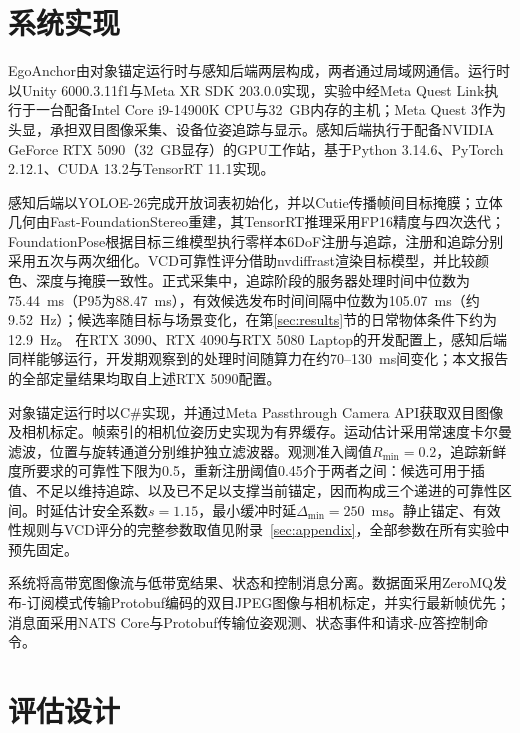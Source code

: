 \documentclass[review]{vgtc}
\begin{document}
\section{系统实现}\label{sec:implementation}

EgoAnchor由对象锚定运行时与感知后端两层构成，两者通过局域网通信。运行时以Unity 6000.3.11f1与Meta XR SDK 203.0.0实现，实验中经Meta Quest Link执行于一台配备Intel Core i9-14900K CPU与32~GB内存的主机；Meta Quest 3作为头显，承担双目图像采集、设备位姿追踪与显示。感知后端执行于配备NVIDIA GeForce RTX 5090（32~GB显存）的GPU工作站，基于Python 3.14.6、PyTorch 2.12.1、CUDA 13.2与TensorRT 11.1实现。

感知后端以YOLOE-26完成开放词表初始化，并以Cutie传播帧间目标掩膜；立体几何由Fast-FoundationStereo重建，其TensorRT推理采用FP16精度与四次迭代；FoundationPose根据目标三维模型执行零样本6DoF注册与追踪，注册和追踪分别采用五次与两次细化。VCD可靠性评分借助nvdiffrast渲染目标模型，并比较颜色、深度与掩膜一致性。正式采集中，追踪阶段的服务器处理时间中位数为75.44~ms（P95为88.47~ms），有效候选发布时间间隔中位数为105.07~ms（约9.52~Hz）；候选率随目标与场景变化，在第\ref{sec:results}节的日常物体条件下约为12.9~Hz。
在RTX 3090、RTX 4090与RTX 5080 Laptop的开发配置上，感知后端同样能够运行，开发期观察到的处理时间随算力在约70--130~ms间变化；本文报告的全部定量结果均取自上述RTX 5090配置。

对象锚定运行时以C\#实现，并通过Meta Passthrough Camera API获取双目图像及相机标定。帧索引的相机位姿历史实现为有界缓存。运动估计采用常速度卡尔曼滤波，位置与旋转通道分别维护独立滤波器。观测准入阈值$R_{\min} = 0.2$，追踪新鲜度所要求的可靠性下限为0.5，重新注册阈值0.45介于两者之间：候选可用于插值、不足以维持追踪、以及已不足以支撑当前锚定，因而构成三个递进的可靠性区间。时延估计安全系数$s = 1.15$，最小缓冲时延$\Delta_{\min} = 250$~ms。静止锚定、有效性规则与VCD评分的完整参数取值见附录~\ref{sec:appendix}，全部参数在所有实验中预先固定。

系统将高带宽图像流与低带宽结果、状态和控制消息分离。数据面采用ZeroMQ发布-订阅模式传输Protobuf编码的双目JPEG图像与相机标定，并实行最新帧优先；消息面采用NATS Core与Protobuf传输位姿观测、状态事件和请求-应答控制命令。

\section{评估设计}\label{sec:evaluation}
\end{document}
